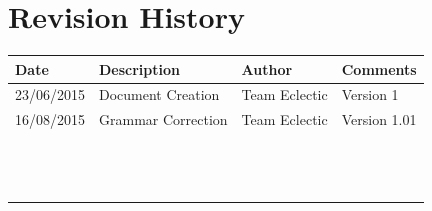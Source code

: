 \documentclass[11pt]{article}
\begin{document}


\setcounter{tocdepth}{3}
\setcounter{secnumdepth}{5}
\tableofcontents

\newpage
\section{Revision History}
\begin{table}[h]
\begin{tabular}{llll}
\textbf{Date}          & \textbf{Description}  & \textbf{Author}       & \textbf{Comments}   \\ \hline
\multicolumn{1}{|R{2cm}|}{23/06/2015} & \multicolumn{1}{L{4.5cm}|}{Document Creation} & \multicolumn{1}{l|}{Team Eclectic} & \multicolumn{1}{L{4cm}|}{Version 1} \\ \hline
\multicolumn{1}{|R{2cm}|}{16/08/2015} & \multicolumn{1}{L{4.5cm}|}{Grammar Correction} & \multicolumn{1}{l|}{Team Eclectic} & \multicolumn{1}{L{4cm}|}{Version 1.01} \\ \hline
\multicolumn{1}{|l|}{} & \multicolumn{1}{l|}{} & \multicolumn{1}{l|}{} & \multicolumn{1}{l|}{} \\ \hline
\multicolumn{1}{|l|}{} & \multicolumn{1}{l|}{} & \multicolumn{1}{l|}{} & \multicolumn{1}{l|}{} \\ \hline
\multicolumn{1}{|l|}{} & \multicolumn{1}{l|}{} & \multicolumn{1}{l|}{} & \multicolumn{1}{l|}{} \\ \hline
\multicolumn{1}{|l|}{} & \multicolumn{1}{l|}{} & \multicolumn{1}{l|}{} & \multicolumn{1}{l|}{} \\ \hline
\multicolumn{1}{|l|}{} & \multicolumn{1}{l|}{} & \multicolumn{1}{l|}{} & \multicolumn{1}{l|}{} \\ \hline
\multicolumn{1}{|l|}{} & \multicolumn{1}{l|}{} & \multicolumn{1}{l|}{} & \multicolumn{1}{l|}{} \\ \hline
\multicolumn{1}{|l|}{} & \multicolumn{1}{l|}{} & \multicolumn{1}{l|}{} & \multicolumn{1}{l|}{} \\ \hline
\multicolumn{1}{|l|}{} & \multicolumn{1}{l|}{} & \multicolumn{1}{l|}{} & \multicolumn{1}{l|}{} \\ \hline
\multicolumn{1}{|l|}{} & \multicolumn{1}{l|}{} & \multicolumn{1}{l|}{} & \multicolumn{1}{l|}{} \\ \hline
\multicolumn{1}{|l|}{} & \multicolumn{1}{l|}{} & \multicolumn{1}{l|}{} & \multicolumn{1}{l|}{} \\ \hline
\multicolumn{1}{|l|}{} & \multicolumn{1}{l|}{} & \multicolumn{1}{l|}{} & \multicolumn{1}{l|}{} \\ \hline
\multicolumn{1}{|l|}{} & \multicolumn{1}{l|}{} & \multicolumn{1}{l|}{} & \multicolumn{1}{l|}{} \\ \hline
\multicolumn{1}{|l|}{} & \multicolumn{1}{l|}{} & \multicolumn{1}{l|}{} & \multicolumn{1}{l|}{} \\ \hline
\end{tabular}
\end{table}
\end{document}
